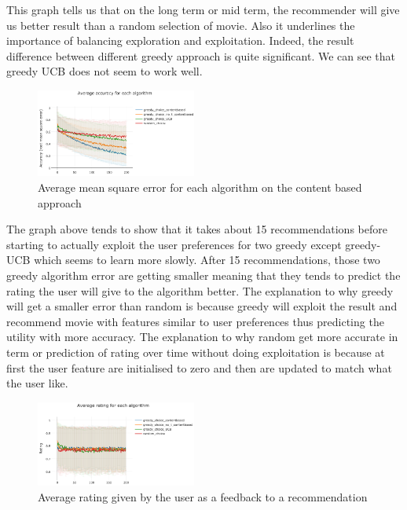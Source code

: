 \documentclass[letterpaper]{article}
\begin{document}
This graph tells us that on the long term or mid term, the recommender will give us better result than a random selection of movie. Also it underlines the importance of balancing exploration and exploitation. Indeed, the result difference between different greedy approach is quite significant. We can see that greedy UCB does not seem to work well.

\begin{figure}[H]
\begin{center}
\includegraphics[width=0.47\textwidth]{img/greedy1.png}
\caption{Average mean square error for each algorithm on the content based approach}
\label{greedy1}
\end{center}
\end{figure}

The graph above tends to show that it takes about 15 recommendations before starting to actually exploit the user preferences for two greedy except greedy-UCB which seems to learn more slowly. After 15 recommendations, those two greedy algorithm error are getting smaller meaning that they tends to predict the rating the user will give to the algorithm better.
The explanation to why greedy will get a smaller error than random is because greedy will exploit the result and recommend movie with features similar to user preferences thus predicting the utility with more accuracy.
The explanation to why random get more accurate in term or prediction of rating over time without doing exploitation is because at first the user feature are initialised to zero and then are updated to match what the user like.

\begin{figure}[H]
\begin{center}
\includegraphics[width=0.47\textwidth]{img/greedy2.png}
\caption{Average rating given by the user as a feedback to a recommendation}
\label{schema2}
\end{center}
\end{figure}
\end{document}
